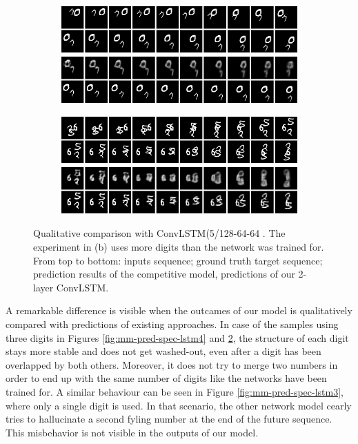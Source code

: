 \begin{figure}[h!tb]
\centering
\begin{subfigure}{0.49\textwidth}
  \centering
  \includegraphics[width=0.92\linewidth]{figures/pred/mm/spec/prediction-04.png}
  \caption{}
  \label{fig:mm-pred-spec2-clstm1}
\end{subfigure}%
\begin{subfigure}{0.49\textwidth}
  \centering
  \includegraphics[width=0.92\linewidth]{figures/pred/mm/spec/prediction-05.png}
  \caption{}
  \label{fig:mm-pred-spec2-clstm2}
\end{subfigure}
\caption[Comparison with other ConvLSTM on Moving MNIST]{Qualitative comparison with ConvLSTM(5/128-64-64 \parencite{conv_lstm_nowcasting}. The experiment in (b) uses more digits than the network was trained for. From top to bottom: inputs sequence; ground truth target sequence; prediction results of the competitive model, predictions of our 2-layer ConvLSTM.} \label{fig:mm-pred-spec2-clstm}
\end{figure}

A remarkable difference is visible when the outcames of our model is qualitatively compared with predictions of existing approaches. In case of the samples using three digits in Figures \ref{fig:mm-pred-spec-lstm4} and \ref{fig:mm-pred-spec2-clstm2}, the structure of each digit stays more stable and does not get washed-out, even after a digit has been overlapped by both others. Moreover, it does not try to merge two numbers in order to end up with the same number of digits like the networks have been trained for. A similar behaviour can be seen in Figure \ref{fig:mm-pred-spec-lstm3}, where only a single digit is used. In that scenario, the other network model cearly tries to hallucinate a second fyling number at the end of the future sequence. This misbehavior is not visible in the outputs of our model.

